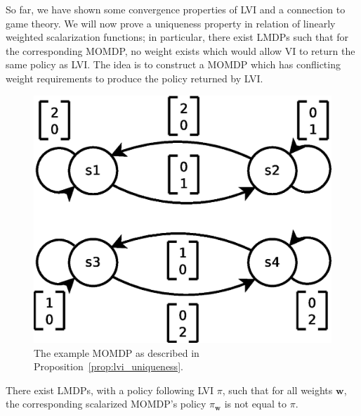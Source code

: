 So far, we have shown some convergence properties of LVI and a connection to game theory. We will now prove a uniqueness property in relation of linearly weighted scalarization functions; in particular, there exist LMDPs such that for the corresponding MOMDP, no weight exists which would allow VI to return the same policy as LVI. The idea is to construct a MOMDP which has conflicting weight requirements to produce the policy returned by LVI.


\begin{figure}%
\begin{center}
    \includegraphics[width=0.75\linewidth]{momdp.eps}
    \caption{The example MOMDP as described in Proposition~\ref{prop:lvi_uniqueness}.}
    \label{fig:example_momdp}
\end{center}
\end{figure}


\begin{proposition}
    \label{prop:lvi_uniqueness}
    There exist LMDPs, with a policy following LVI $\pi$, such that for all weights $\mathbf{w}$, the corresponding scalarized MOMDP's policy $\pi_{\mathbf{w}}$ is not equal to $\pi$.
\end{proposition}

